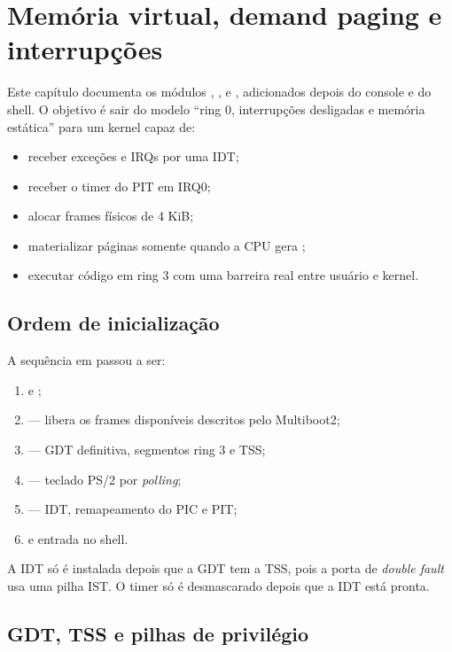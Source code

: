 \chapter{Mem\'oria virtual, demand paging e interrup\c{c}\~oes}
\label{cap:memoria-usuario}

Este cap\'itulo documenta os m\'odulos , ,
 e , adicionados depois do console e do shell.
O objetivo \'e sair do modelo ``ring 0, interrup\c{c}\~oes desligadas e
mem\'oria est\'atica'' para um kernel capaz de:

\begin{itemize}
  \item receber exce\c{c}\~oes e IRQs por uma IDT;
  \item receber o timer do PIT em IRQ0;
  \item alocar frames f\'isicos de 4 KiB;
  \item materializar p\'aginas somente quando a CPU gera ;
  \item executar c\'odigo em ring 3 com uma barreira real entre usu\'ario e
        kernel.
\end{itemize}

\section{Ordem de inicializa\c{c}\~ao}

A sequ\^encia em  passou a ser:

\begin{enumerate}
  \item {} e ;
  \item {} --- libera os frames dispon\'iveis
        descritos pelo Multiboot2;
  \item {} --- GDT definitiva, segmentos ring 3 e TSS;
  \item {} --- teclado PS/2 por \emph{polling};
  \item {} --- IDT, remapeamento do PIC e PIT;
  \item {} e entrada no shell.
\end{enumerate}

A IDT s\'o \'e instalada depois que a GDT tem a TSS, pois a porta de
\emph{double fault} usa uma pilha IST. O timer s\'o \'e desmascarado depois
que a IDT est\'a pronta.

\section{GDT, TSS e pilhas de privil\'egio}

